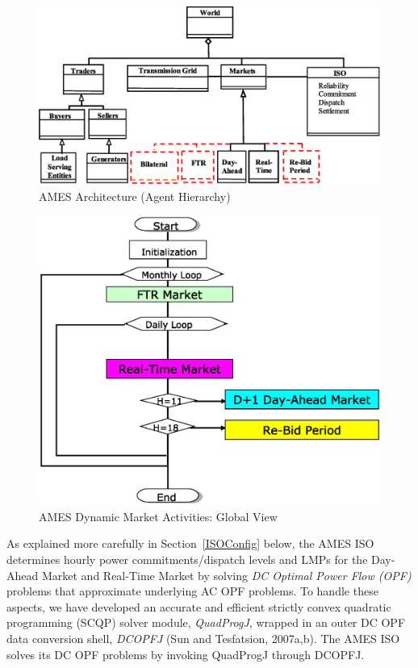 \documentclass[12pt]{article}
\begin{document}
\begin{figure}
	\centering
		\includegraphics[totalheight = 9cm]{AMES.architecture.eps}
	\caption{AMES Architecture (Agent Hierarchy)}
	\label{fig:AMES.architecture}
\end{figure}  

\begin{figure}
	\centering
		\includegraphics[totalheight = 9cm]{AMES.SimpleView.eps}
	\caption{AMES Dynamic Market Activities: Global View}
	\label{fig:AMES.SimpleView}
\end{figure}      

As explained more carefully in Section~\ref{ISOConfig} below, the AMES ISO determines hourly power commitments/dispatch levels and LMPs for the Day-Ahead Market and Real-Time Market by solving \textit{DC Optimal Power Flow (OPF)\/} problems that approximate underlying AC OPF problems. To handle these aspects, we have developed an accurate and efficient strictly convex quadratic programming (SCQP) solver module, \textit{QuadProgJ\/}, wrapped in an outer DC OPF data conversion shell, \textit{DCOPFJ} (Sun and Tesfatsion, 2007a,b).  The AMES ISO solves its DC OPF problems by invoking QuadProgJ through DCOPFJ. 
\end{document}
